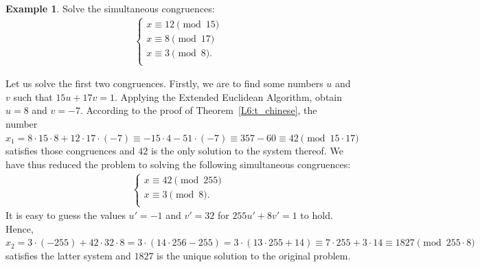 \documentclass[12pt,notitlepage]{article}
\theoremstyle{plain}
\theoremstyle{definition}
\newtheorem{exm}[thm]{Example}
\theoremstyle{plain}
\newcommand{\1}{\mathbf{1}}
\newcommand{\0}{\mathbf{0}}
\begin{document}
\begin{exm}
Solve the simultaneous congruences:
$$
\begin{array}{l}
\begin{cases}
	 x \equiv 12 \pmod {15}\\
	 x \equiv 8 \pmod {17}\\
	 x \equiv 3 \pmod 8.\\
\end{cases}
\end{array}
$$

Let us solve the first two congruences. Firstly, we are to find some numbers $u$ and $v$ such that $15 u + 17 v = 1$. Applying the Extended Euclidean Algorithm, obtain $u = 8$ and $v = -7$. According to the proof of Theorem~\ref{L6:t_chinese}, the number $x_1 = 8 \cdot 15 \cdot 8  + 12 \cdot 17 \cdot (-7) \equiv -15 \cdot 4 - 51 \cdot (-7) \equiv 357 - 60 \equiv 42 \pmod {15 \cdot 17}$ satisfies those congruences and $42$ is the only solution to the system thereof. We have thus reduced the problem to solving the following simultaneous congruences:
$$
\begin{array}{l}
\begin{cases}
	 x \equiv 42 \pmod {255}\\
	 x \equiv 3 \pmod 8.\\
\end{cases}
\end{array}
$$
It is easy to guess the values $u' = -1$ and $v' = 32$ for $255u' + 8v' = 1$ to hold. Hence, $x_2 = 3\cdot (-255) + 42 \cdot 32 \cdot 8 = 3\cdot (14 \cdot 256 - 255) = 3 \cdot (13 \cdot 255 + 14) \equiv 7 \cdot 255 + 3 \cdot 14 \equiv 1827 \pmod {255 \cdot 8}$ satisfies the latter system and $1827$ is the unique solution to the original problem.
\end{exm}
\end{document}
